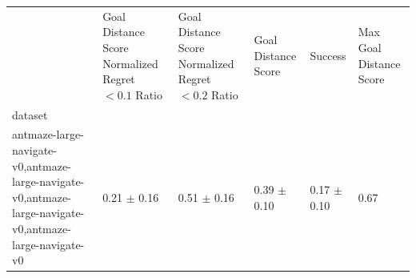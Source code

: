 \begin{tabular}{llllll}
\toprule
 & Goal Distance Score Normalized Regret $< 0.1$ Ratio & Goal Distance Score Normalized Regret $< 0.2$ Ratio & Goal Distance Score & Success & Max Goal Distance Score \\
dataset &  &  &  &  &  \\
\midrule
antmaze-large-navigate-v0,antmaze-large-navigate-v0,antmaze-large-navigate-v0,antmaze-large-navigate-v0 & 0.21 $\pm$ 0.16 & 0.51 $\pm$ 0.16 & 0.39 $\pm$ 0.10 & 0.17 $\pm$ 0.10 & 0.67 \\
\bottomrule
\end{tabular}
